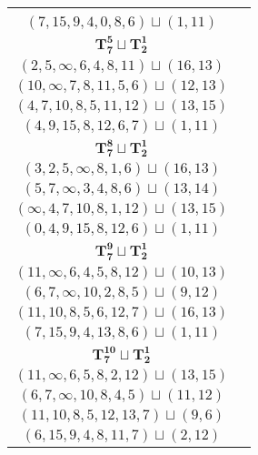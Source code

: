 \documentclass{article}
\begin{document}
\begin{longtable}{|c|c|}
\begin{tabular}{c}
        $(11,10,7,4,1,8,12)\sqcup(13,15)$ \\ 
        $(7,15,9,4,0,8,6)\sqcup(1,11)$
        \end{tabular} \\ 
        \hline
        $\mathbf{T_{7}^{5}} \sqcup \mathbf{T_{2}^{1}}$ & \begin{tabular}{c}
        $(5,4,2,3,6,0,1)\sqcup(9,\infty)$ \\ 
        $(2,5,\infty,6,4,8,11)\sqcup(16,13)$ \\ 
        $(10,\infty,7,8,11,5,6)\sqcup(12,13)$ \\ 
        $(4,7,10,8,5,11,12)\sqcup(13,15)$ \\ 
        $(4,9,15,8,12,6,7)\sqcup(1,11)$
        \end{tabular} \\ 
        \hline
        $\mathbf{T_{7}^{8}} \sqcup \mathbf{T_{2}^{1}}$ & \begin{tabular}{c}
        $(8,5,4,2,0,6,\infty)\sqcup(11,13)$ \\ 
        $(3,2,5,\infty,8,1,6)\sqcup(16,13)$ \\ 
        $(5,7,\infty,3,4,8,6)\sqcup(13,14)$ \\ 
        $(\infty,4,7,10,8,1,12)\sqcup(13,15)$ \\ 
        $(0,4,9,15,8,12,6)\sqcup(1,11)$
        \end{tabular} \\ 
        \hline
        $\mathbf{T_{7}^{9}} \sqcup \mathbf{T_{2}^{1}}$ & \begin{tabular}{c}
        $(1,2,4,5,7,0,3)\sqcup(8,11)$ \\ 
        $(11,\infty,6,4,5,8,12)\sqcup(10,13)$ \\ 
        $(6,7,\infty,10,2,8,5)\sqcup(9,12)$ \\ 
        $(11,10,8,5,6,12,7)\sqcup(16,13)$ \\ 
        $(7,15,9,4,13,8,6)\sqcup(1,11)$
        \end{tabular} \\ 
        \hline
        $\mathbf{T_{7}^{10}} \sqcup \mathbf{T_{2}^{1}}$ & \begin{tabular}{c}
        $(1,2,4,6,0,3,5)\sqcup(8,11)$ \\ 
        $(11,\infty,6,5,8,2,12)\sqcup(13,15)$ \\ 
        $(6,7,\infty,10,8,4,5)\sqcup(11,12)$ \\ 
        $(11,10,8,5,12,13,7)\sqcup(9,6)$ \\ 
        $(6,15,9,4,8,11,7)\sqcup(2,12)$

\end{tabular}
\end{longtable}
\end{document}
